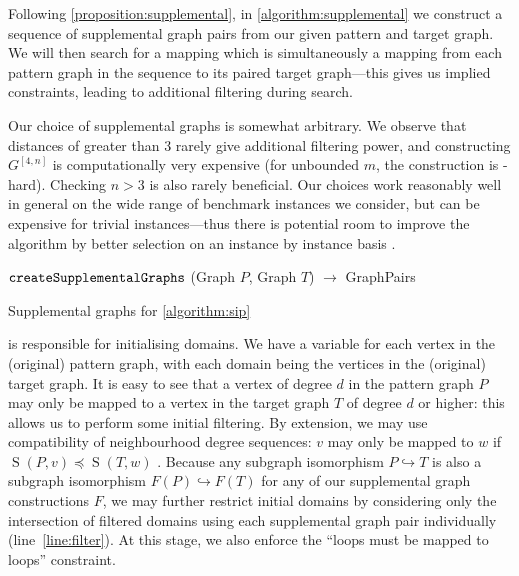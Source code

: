 \documentclass{llncs}
\newcommand{\lineref}[1]{line~\ref{#1}}
\begin{document}
Following \cref{proposition:supplemental}, in \cref{algorithm:supplemental} we construct a sequence
of supplemental graph pairs from our given pattern and target graph. We will then search for a
mapping which is simultaneously a mapping from each pattern graph in the sequence to its paired
target graph---this gives us implied constraints, leading to additional filtering during search.

Our choice of supplemental graphs is somewhat arbitrary. We observe that distances of greater than 3
rarely give additional filtering power, and constructing $G^{\left[4,n\right]}$ is computationally
very expensive (for unbounded $m$, the construction is \NP-hard). Checking $n > 3$ is also rarely
beneficial. Our choices work reasonably well in general on the wide range of benchmark instances we
consider, but can be expensive for trivial instances---thus there is potential room to improve the
algorithm by better selection on an instance by instance basis \cite{Malitsky:2014}.

\begin{algorithm}[h]
\DontPrintSemicolon
\nl $\FuncSty{createSupplementalGraphs}$ (Graph $P$, Graph $T$) $\rightarrow$ GraphPairs \;
\nl {}
\caption{Supplemental graphs for \cref{algorithm:sip}}
\label{algorithm:supplemental}
\end{algorithm}

 is responsible for initialising domains. We have a variable for each vertex in
the (original) pattern graph, with each domain being the vertices in the (original) target graph. It
is easy to see that a vertex of degree $d$ in the pattern graph $P$ may only be mapped to a vertex in
the target graph $T$ of degree $d$ or higher: this allows us to perform some initial filtering. By
extension, we may use compatibility of neighbourhood degree sequences: $v$ may only be mapped to $w$
if $\operatorname{S}(P, v) \preceq \operatorname{S}(T, w)$ \cite{Zampelli:2010}.  Because any
subgraph isomorphism $P \hookrightarrow T$ is also a subgraph isomorphism $F(P) \hookrightarrow
F(T)$ for any of our supplemental graph constructions $F$, we may further restrict initial domains
by considering only the intersection of filtered domains using each supplemental graph pair
individually (\lineref{line:filter}). At this stage, we also enforce the ``loops must be mapped to loops'' constraint.
\end{document}
